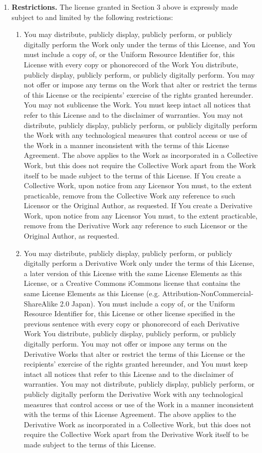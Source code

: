 \begin{enumerate}
\item \textbf{Restrictions.} The license granted in Section 3 above is
expressly made subject to and limited by the following restrictions:

\begin{enumerate}
\item You may distribute, publicly display, publicly perform, or
publicly digitally perform the Work only under the terms of this
License, and You must include a copy of, or the Uniform Resource
Identifier for, this License with every copy or phonorecord of the
Work You distribute, publicly display, publicly perform, or publicly
digitally perform. You may not offer or impose any terms on the Work
that alter or restrict the terms of this License or the recipients'
exercise of the rights granted hereunder. You may not sublicense the
Work. You must keep intact all notices that refer to this License and
to the disclaimer of warranties. You may not distribute, publicly
display, publicly perform, or publicly digitally perform the Work with
any technological measures that control access or use of the Work in a
manner inconsistent with the terms of this License Agreement. The
above applies to the Work as incorporated in a Collective Work, but
this does not require the Collective Work apart from the Work itself
to be made subject to the terms of this License. If You create a
Collective Work, upon notice from any Licensor You must, to the extent
practicable, remove from the Collective Work any reference to such
Licensor or the Original Author, as requested. If You create a
Derivative Work, upon notice from any Licensor You must, to the extent
practicable, remove from the Derivative Work any reference to such
Licensor or the Original Author, as requested.

\item You may distribute, publicly display, publicly perform, or
publicly digitally perform a Derivative Work only under the terms of
this License, a later version of this License with the same License
Elements as this License, or a Creative Commons iCommons license that
contains the same License Elements as this License
(e.g. Attribution-NonCommercial-ShareAlike 2.0 Japan). You must
include a copy of, or the Uniform Resource Identifier for, this
License or other license specified in the previous sentence with every
copy or phonorecord of each Derivative Work You distribute, publicly
display, publicly perform, or publicly digitally perform. You may not
offer or impose any terms on the Derivative Works that alter or
restrict the terms of this License or the recipients' exercise of the
rights granted hereunder, and You must keep intact all notices that
refer to this License and to the disclaimer of warranties. You may not
distribute, publicly display, publicly perform, or publicly digitally
perform the Derivative Work with any technological measures that
control access or use of the Work in a manner inconsistent with the
terms of this License Agreement. The above applies to the Derivative
Work as incorporated in a Collective Work, but this does not require
the Collective Work apart from the Derivative Work itself to be made
subject to the terms of this License.


\end{enumerate}
\end{enumerate}
